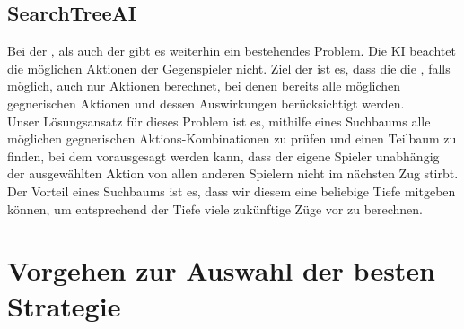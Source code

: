 \subsection{SearchTreeAI}
\label{subsec:searchtree-ai}

Bei der , als auch der  gibt es weiterhin ein bestehendes
Problem.
Die \ac{KI} beachtet die möglichen Aktionen der Gegenspieler nicht.
Ziel der  ist es, dass die die , falls möglich, auch nur Aktionen berechnet,
bei denen bereits alle möglichen gegnerischen Aktionen und dessen Auswirkungen berücksichtigt werden. \\

Unser Lösungsansatz für dieses Problem ist es, mithilfe eines Suchbaums alle möglichen gegnerischen
Aktions-Kombinationen zu prüfen und einen Teilbaum zu finden, bei dem vorausgesagt werden kann, dass
der eigene Spieler unabhängig der ausgewählten Aktion von allen anderen Spielern nicht im nächsten Zug stirbt.
Der Vorteil eines Suchbaums ist es, dass wir diesem eine
beliebige Tiefe mitgeben können, um entsprechend der Tiefe viele zukünftige Züge vor zu berechnen.

\section{Vorgehen zur Auswahl der besten Strategie}
\label{sec:vorgehen-strategieauswahl}
